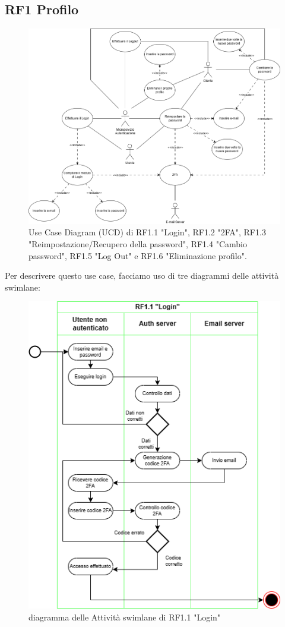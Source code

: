 \documentclass{report}
\begin{document}
\subsection*{RF1 Profilo }
\begin{figure}[H]
	\centering\includegraphics[width=1\textwidth]{images/UCD/RF1_login_UCD.png}
	Use Case Diagram (UCD) di RF1.1 "Login", RF1.2 "2FA", RF1.3 "Reimpostazione/Recupero della password", RF1.4 "Cambio password", RF1.5 "Log Out" e RF1.6 "Eliminazione profilo".
\end{figure}
Per descrivere questo use case, facciamo uso di tre diagrammi delle attività swimlane:
\begin{figure}[H]
	\centering\includegraphics[width=1\textwidth]{images/Login_Swimlane.drawio.png}
	diagramma delle Attività swimlane di RF1.1 "Login"
\end{figure}
\end{document}
